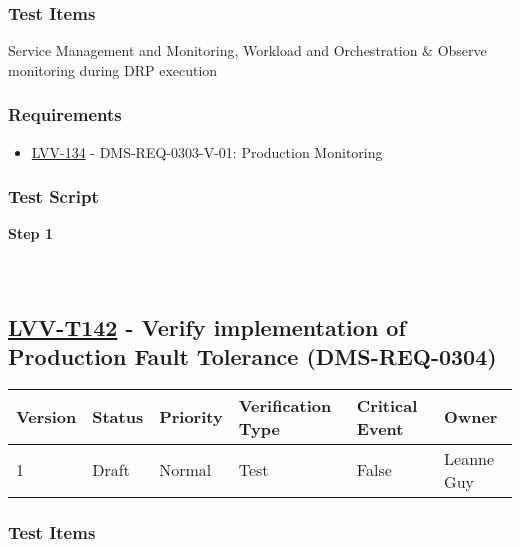 \hypertarget{test-items-117}{%
\subsubsection{Test Items}\label{test-items-117}}

Service Management and Monitoring, Workload and Orchestration \& Observe
monitoring during DRP execution

\hypertarget{requirements-118}{%
\subsubsection{Requirements}\label{requirements-118}}

\begin{itemize}
\tightlist
\item
  \href{https://jira.lsstcorp.org/browse/LVV-134}{LVV-134} -
  DMS-REQ-0303-V-01: Production Monitoring
\end{itemize}

\hypertarget{test-script-118}{%
\subsubsection{Test Script}\label{test-script-118}}

\textbf{Step 1}\\
~\\
~\\

\hypertarget{lvv-t142---verify-implementation-of-production-fault-tolerance-dms-req-0304}{%
\subsection{\texorpdfstring{\href{https://jira.lsstcorp.org/secure/Tests.jspa\#/testCase/LVV-T142}{LVV-T142}
- Verify implementation of Production Fault Tolerance
(DMS-REQ-0304)}{LVV-T142 - Verify implementation of Production Fault Tolerance (DMS-REQ-0304)}}\label{lvv-t142---verify-implementation-of-production-fault-tolerance-dms-req-0304}}

\begin{longtable}[]{@{}llllll@{}}
\toprule
Version & Status & Priority & Verification Type & Critical Event &
Owner\tabularnewline
\midrule
\endhead
1 & Draft & Normal & Test & False & Leanne Guy\tabularnewline
\bottomrule
\end{longtable}

\hypertarget{test-items-118}{%
\subsubsection{Test Items}\label{test-items-118}}

